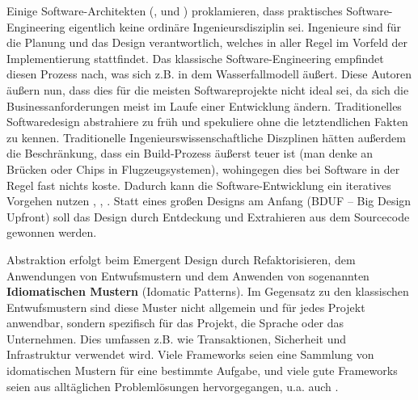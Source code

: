 



Einige Software-Architekten (\citeauthor*{neal_ford_emergent_2010}, \citeauthor*{jack_reeves_three_1992} und \citeauthor{glenn_vanderburg_real_2010}) proklamieren, dass praktisches Software-Engineering eigentlich keine ordinäre Ingenieursdisziplin sei. Ingenieure sind für die Planung und das Design verantwortlich, welches in aller Regel im Vorfeld der Implementierung stattfindet. Das klassische Software-Engineering empfindet diesen Prozess nach, was sich z.B. in dem Wasserfallmodell äußert. Diese Autoren äußern nun, dass dies für die meisten Softwareprojekte nicht ideal sei, da sich die Businessanforderungen meist im Laufe einer Entwicklung ändern. Traditionelles Softwaredesign abstrahiere zu früh und spekuliere ohne die letztendlichen Fakten zu kennen. Traditionelle Ingenieurswissenschaftliche Diszplinen hätten außerdem die Beschränkung, dass ein Build-Prozess äußerst teuer ist (man denke an Brücken oder Chips in Flugzeugsystemen), wohingegen dies bei Software in der Regel fast nichts koste. Dadurch kann die Software-Entwicklung ein iteratives Vorgehen nutzen \citep{neal_ford_emergent_2010}, \citep{glenn_vanderburg_real_2010}, \citep{jack_reeves_three_1992}. Statt eines großen Designs am Anfang (BDUF -- Big Design Upfront) soll das Design durch Entdeckung und Extrahieren aus dem Sourcecode gewonnen werden.

Abstraktion erfolgt beim Emergent Design durch Refaktorisieren, dem Anwendungen von Entwufsmustern und dem Anwenden von sogenannten \textbf{Idiomatischen Mustern} (Idomatic Patterns). Im Gegensatz zu den klassischen Entwufsmustern sind diese Muster nicht allgemein und für jedes Projekt anwendbar, sondern spezifisch für das Projekt, die Sprache oder das Unternehmen. Dies umfassen z.B. wie Transaktionen, Sicherheit und Infrastruktur verwendet wird. Viele Frameworks seien eine Sammlung von idomatischen Mustern für eine bestimmte Aufgabe, und viele gute Frameworks seien aus alltäglichen Problemlösungen hervorgegangen, u.a. auch  \citep{neal_ford_ibm_2010}.

